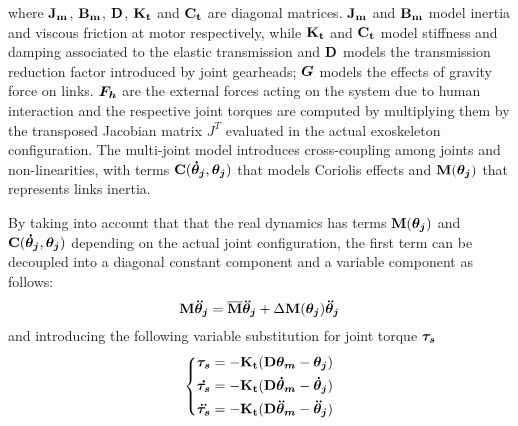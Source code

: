 where $\mathbf{J_m}$, $\mathbf{B_m}$, $\mathbf{D}$, $\mathbf{K_t}$ and $\mathbf{C_t}$ are diagonal matrices.  $\mathbf{J_m}$ and $\mathbf{B_m}$ model inertia and viscous friction at motor respectively, while $\mathbf{K_t}$ and $\mathbf{C_t}$ model stiffness and damping associated to the elastic transmission and $\mathbf{D}$ models  the transmission reduction factor introduced by joint gearheads; ${ \boldsymbol {G}}$ models the effects of gravity force on links.
${ \boldsymbol {F_h}}$ are the external  forces  acting on the system  due to human interaction  and the respective joint torques are computed by multiplying them by the transposed Jacobian matrix  $J^T$ evaluated in the actual exoskeleton configuration. The multi-joint model introduces cross-coupling among joints and non-linearities, with terms $ \mathbf{C}( { \boldsymbol {\dot{\theta}_j}}, { \boldsymbol {\theta_j}})  $ that models Coriolis effects and $\mathbf{M}({ \boldsymbol {\theta_j}}) $ that represents links inertia.

By taking into account that
that the real dynamics has terms  $\mathbf{M}({ \boldsymbol {\theta_j}}) $  and $ \mathbf{C}( { \boldsymbol {\dot{\theta}_j}}, { \boldsymbol {\theta_j}}) $ depending on the actual joint configuration, the first term can be decoupled into a diagonal constant component and a variable component as follows:
\begin{equation}
\vectm{M }  \vects{\ddot{\theta}_j}=
\overline{\vectm{M} } \vects{\ddot{\theta}_j} + \Delta \vectm{M} (\vects{\theta_j}) \vects{\ddot{\theta}_j} 
\label{eq:InertialComponent}
\end{equation}
and introducing  the following variable substitution for joint torque ${ \boldsymbol {\tau_s}}$
\footnotesize
\begin{equation}
\left \{
\begin{aligned}
\vects{\tau_s} & = - \vectm{K_t}  ( \vectm{D} \vects{\theta_m}- \vects{\theta_j} ) \\
\vects{\dot{\tau_s}} & = - \vectm{K_t}  ( \vectm{D}  \vects{\dot{\theta}_m} - \vects{\dot{\theta}_j} ) \\
\vects{\ddot{\tau_s}} & = - \vectm{K_t}  ( \vectm{D}  \vects{\ddot{\theta}_m} - \vects{\ddot{\theta}_j} ) \\
\end{aligned}
\right .
\label{eq:taus}
\end{equation}
\normalsize

